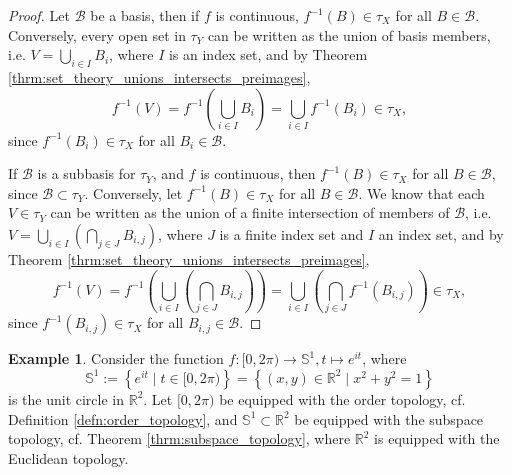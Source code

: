 \documentclass[12pt, a4paper]{article}
\numberwithin{equation}{section}
\theoremstyle{definition}
\theoremstyle{definition}
\newtheorem{exmp}[thm]{Example} %
\begin{document}
		\begin{proof}
			Let $\mathscr B$ be a basis, then if $f$ is continuous, $f^{-1}(B)\in\tau_X$ for all $B\in \mathscr B$. Conversely, every open set in $\tau_Y$ can be written as the union of basis members, i.e. $V = \bigcup_{i\in I}B_i$, where $I$ is an index set, and by Theorem \ref{thrm:set_theory_unions_intersects_preimages}, $$f^{-1}(V) = f^{-1}\left(\bigcup_{i\in I}B_i\right) = \bigcup_{i\in I}f^{-1}(B_i)\in \tau_X,$$ since $f^{-1}(B_i)\in\tau_X$ for all $B_i\in\mathscr B$.
			
			If $\mathscr B$ is a subbasis for $\tau_Y$, and $f$ is continuous, then $f^{-1}(B)\in \tau_X$ for all $B\in\mathscr B$, since $\mathscr B\subset \tau_Y$. Conversely, let $f^{-1}(B) \in \tau_X$ for all $B\in\mathscr B$. We know that each $V\in \tau_Y$ can be written as the union of a finite intersection of members of $\mathscr B$, i.e. $V = \bigcup_{i\in I}\left(\bigcap_{j\in J}B_{i, j}\right)$, where $J$ is a finite index set and $I$ an index set, and by Theorem \ref{thrm:set_theory_unions_intersects_preimages},
			$$f^{-1}(V) = f^{-1}\left(\bigcup_{i\in I}\left(\bigcap_{j\in J}B_{i, j}\right)\right) = \bigcup_{i\in I}\left(\bigcap_{j\in J}f^{-1}(B_{i, j})\right)\in \tau_X,$$
			since $f^{-1}(B_{i, j})\in \tau_X$ for all $B_{i, j}\in \mathscr B$.
		\end{proof}
		
		\begin{exmp}
			Consider the function $f: [0, 2\pi)\to \mathbb S^1, t\mapsto e^{it}$, where $$\mathbb S^1 := \left\{e^{it} \mid t\in [0, 2\pi)\right\} = \left\{(x, y)\in\mathbb R^2 \mid x^2 + y^2  = 1\right\}$$ is the unit circle in $\mathbb R^2$. Let $[0, 2\pi)$ be equipped with the order topology, cf. Definition \ref{defn:order_topology}, and $\mathbb S^1\subset\mathbb R^2$ be equipped with the subspace topology, cf. Theorem \ref{thrm:subspace_topology}, where $\mathbb R^2$ is equipped with the Euclidean topology.
		\end{exmp}
		
\end{document}
